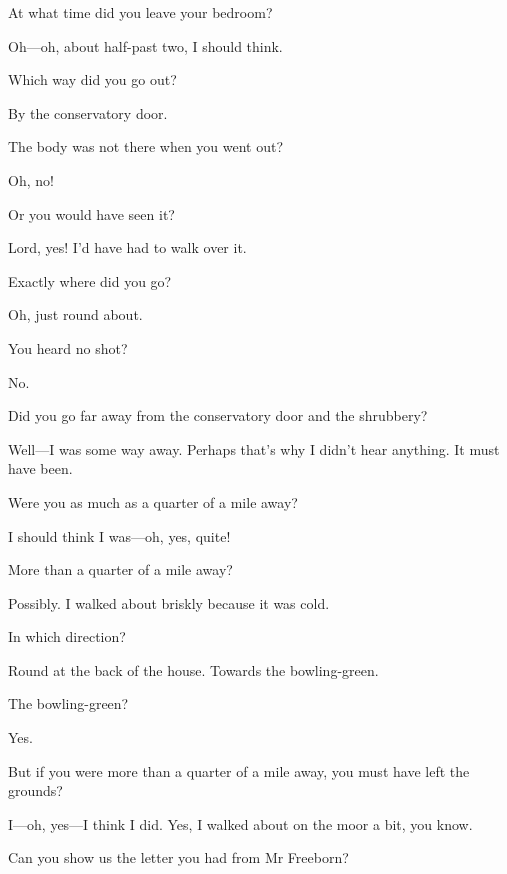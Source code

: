 \begin{dialogue}
 At what time did you leave your bedroom?

 Oh\allowbreak---\allowbreak oh, about half-past two, I should think.

 Which way did you go out?

 By the conservatory door.

 The body was not there when you went out?

 Oh, no!

 Or you would have seen it?

 Lord, yes! I'd have had to walk over it.

 Exactly where did you go?

  Oh, just round about.

 You heard no shot?

 No.

 Did you go far away from the conservatory door and the shrubbery?

 Well\allowbreak---\allowbreak I was some way away. Perhaps that's why I didn't hear anything. It must have been.

 Were you as much as a quarter of a mile away?

 I should think I was\allowbreak---\allowbreak oh, yes, quite!

 More than a quarter of a mile away?

 Possibly. I walked about briskly because it was cold.

 In which direction?

  Round at the back of the house.  Towards the bowling-green.

 The bowling-green?

  Yes.

 But if you were more than a quarter of a mile away, you must have left the grounds?

 I\allowbreak---\allowbreak oh, yes\allowbreak---\allowbreak I think I did. Yes, I walked about on the moor a bit, you know.

 Can you show us the letter you had from Mr Freeborn?


\end{dialogue}
